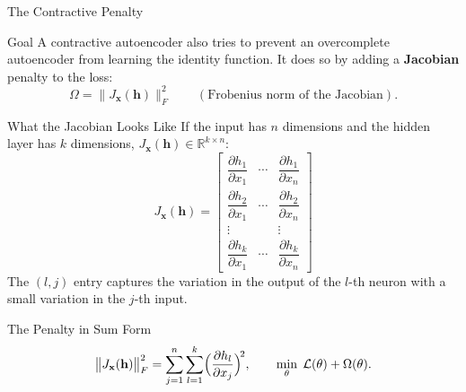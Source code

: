\documentclass{beamer}
\begin{document}
\begin{frame}[shrink=10]{The Contractive Penalty}
  \begin{block}{Goal}
    A contractive autoencoder also tries to prevent an overcomplete
    autoencoder from learning the identity function. It does so by adding a
    \textbf{Jacobian} penalty to the loss:
    \[
      \Omega = \bigl\| J_{\mathbf{x}}(\mathbf{h}) \bigr\|_F^{2}
      \qquad (\text{Frobenius norm of the Jacobian}).
    \]
  \end{block}

  \begin{block}{What the Jacobian Looks Like}
    If the input has $n$ dimensions and the hidden layer has $k$
    dimensions, $J_{\mathbf{x}}(\mathbf{h}) \in \mathbb{R}^{k\times n}$:
    \[
      J_{\mathbf{x}}(\mathbf{h}) =
      \begin{bmatrix}
        \dfrac{\partial h_1}{\partial x_1} & \cdots & \dfrac{\partial h_1}{\partial x_n}\\[6pt]
        \dfrac{\partial h_2}{\partial x_1} & \cdots & \dfrac{\partial h_2}{\partial x_n}\\[6pt]
        \vdots & & \vdots\\[2pt]
        \dfrac{\partial h_k}{\partial x_1} & \cdots & \dfrac{\partial h_k}{\partial x_n}
      \end{bmatrix}
    \]
    The $(l,j)$ entry captures the variation in the output of the $l$-th
    neuron with a small variation in the $j$-th input.
  \end{block}

  \begin{block}{The Penalty in Sum Form}
    \[
      \bigl\| J_{\mathbf{x}}(\mathbf{h}) \bigr\|_F^{2}
        = \sum_{j=1}^{n}\sum_{l=1}^{k}
          \Bigl(\frac{\partial h_l}{\partial x_j}\Bigr)^{\!2},
      \qquad
      \min_{\theta}\; \mathcal L(\theta) + \Omega(\theta).
    \]
  \end{block}
\end{frame}
\end{document}
